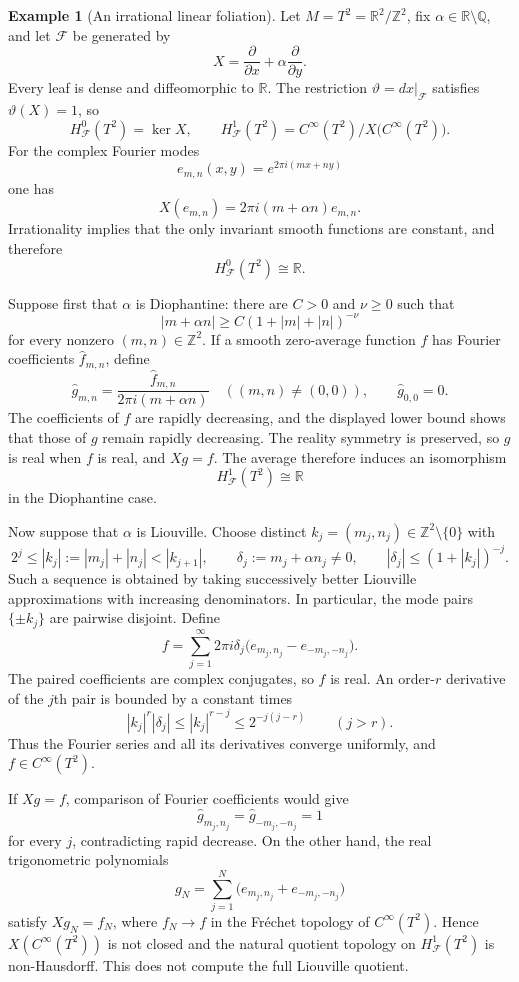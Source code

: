 \documentclass[12pt]{amsart}
\theoremstyle{definition}
\newtheorem{example}[thm]{Example}
\theoremstyle{remark}
\numberwithin{equation}{section}
\newcommand{\CF}{{\mathcal F}}
\newcommand{\Z}{{\mathbb{Z}}}
\newcommand{\Q}{{\mathbb{Q}}}
\newcommand{\R}{{\mathbb{R}}}
\newcommand{\1}{{\mathbb{1}}}
\begin{document}
\begin{example}[An irrational linear foliation]
\label{ex:irrational-torus}
Let $M=T^2=\R^2/\Z^2$, fix
$\alpha\in\R\setminus\Q$, and let $\CF$ be generated by
\[
 X=\frac{\partial}{\partial x}
   +\alpha\frac{\partial}{\partial y}.
\]
Every leaf is dense and diffeomorphic to $\R$.  The restriction
$\vartheta=dx|_{\CF}$ satisfies $\vartheta(X)=1$, so
\[
 H^0_{\CF}(T^2)=\ker X,\qquad
 H^1_{\CF}(T^2)
 =
 C^\infty(T^2)/X\bigl(C^\infty(T^2)\bigr).
\]
For the complex Fourier modes
\[
 e_{m,n}(x,y)=e^{2\pi i(mx+ny)}
\]
one has
\[
 X(e_{m,n})=2\pi i(m+\alpha n)e_{m,n}.
\]
Irrationality implies that the only invariant smooth functions are
constant, and therefore
\[
 H^0_{\CF}(T^2)\cong\R.
\]

Suppose first that $\alpha$ is Diophantine: there are
$C>0$ and $\nu\geq0$ such that
\[
 |m+\alpha n|
 \geq C(1+|m|+|n|)^{-\nu}
\]
for every nonzero $(m,n)\in\Z^2$.  If a smooth zero-average function
$f$ has Fourier coefficients $\widehat f_{m,n}$, define
\[
 \widehat g_{m,n}
 =
 \frac{\widehat f_{m,n}}{2\pi i(m+\alpha n)}
 \quad ((m,n)\neq(0,0)),
 \qquad
 \widehat g_{0,0}=0.
\]
The coefficients of $f$ are rapidly decreasing, and the displayed
lower bound shows that those of $g$ remain rapidly decreasing.
The reality symmetry is preserved, so $g$ is real when $f$ is real,
and $Xg=f$.  The average therefore induces an isomorphism
\[
 H^1_{\CF}(T^2)\cong\R
\]
in the Diophantine case.

Now suppose that $\alpha$ is Liouville.  Choose distinct
$k_j=(m_j,n_j)\in\Z^2\setminus\{0\}$ with
\[
 2^j\leq |k_j|:=|m_j|+|n_j|<|k_{j+1}|,\qquad
 \delta_j:=m_j+\alpha n_j\neq0,\qquad
 |\delta_j|\leq(1+|k_j|)^{-j}.
\]
Such a sequence is obtained by taking successively better Liouville
approximations with increasing denominators.  In particular, the mode
pairs $\{\pm k_j\}$ are pairwise disjoint.  Define
\[
 f=
 \sum_{j=1}^{\infty}
 2\pi i\delta_j
 \bigl(e_{m_j,n_j}-e_{-m_j,-n_j}\bigr).
\]
The paired coefficients are complex conjugates, so $f$ is real.  An
order-$r$ derivative of the $j$th pair is bounded by a constant times
\[
 |k_j|^r|\delta_j|
 \leq |k_j|^{r-j}
 \leq 2^{-j(j-r)}
 \qquad(j>r).
\]
Thus the Fourier series and all its derivatives converge uniformly,
and $f\in C^\infty(T^2)$.

If $Xg=f$, comparison of Fourier coefficients would give
\[
 \widehat g_{m_j,n_j}
 =
 \widehat g_{-m_j,-n_j}
 =1
\]
for every $j$, contradicting rapid decrease.  On the other hand, the
real trigonometric polynomials
\[
 g_N=\sum_{j=1}^N
 \bigl(e_{m_j,n_j}+e_{-m_j,-n_j}\bigr)
\]
satisfy $Xg_N=f_N$, where $f_N\to f$ in the Fr\'echet topology of
$C^\infty(T^2)$.  Hence $X(C^\infty(T^2))$ is not closed and the
natural quotient topology on $H^1_{\CF}(T^2)$ is non-Hausdorff.
This does not compute the full Liouville quotient.


\end{example}
\end{document}
